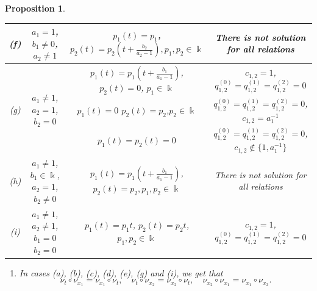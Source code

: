 \documentclass{amsart}
\newtheorem{proposition}[theorem]{Proposition}
\theoremstyle{definition}
\theoremstyle{remark}
\numberwithin{equation}{section}
\begin{document}
\begin{proposition}
\begin{table}[h]
\begin{center}
{\begin{tabular}{ |c|c|c|c| }
\hline
{{\rm (f)}} & $a_1=1$, $b_1\not=0$, $a_2\not=1$ & $p_1(t)=p_1$,  $p_2(t)=p_2\left(t+\frac{b_2}{a_2-1}\right), p_1,p_2\in\Bbbk$ & There is not solution for all relations \\ 
\hline
\multirow{3}{*}{{\rm (g)}} & \multirow{3}{*}{$a_1\not=1$,  $a_2=1$, $b_2=0$} & $p_1(t)=p_1\left(t+\frac{b_1}{a_1-1}\right)$, $p_2(t)=0$, $p_1\in\Bbbk$ & $c_{1,2}=1$, $q_{1,2}^{(0)}=q_{1,2}^{(1)}=q_{1,2}^{(2)}=0$ \\ \cline{3-4}
&  & $p_1(t)=0$ $p_2(t)=p_2$,$p_2\in\Bbbk$  & $q_{1,2}^{(0)}=q_{1,2}^{(1)}=q_{1,2}^{(2)}=0$,  $c_{1,2}=a_{1}^{-1}$ \\ \cline{3-4}
&  & $p_1(t)=p_2(t)=0$ & $q_{1,2}^{(0)}=q_{1,2}^{(1)}=q_{1,2}^{(2)}=0$,  $c_{1,2}\not\in\{1,a_1^{-1}\}$ \\ 
\hline
{{\rm (h)}} & $a_1\not=1$, $b_1\in\Bbbk$,  $a_2=1$, $b_2\not=0$ & $p_1(t)=p_1\left(t+\frac{b_1}{a_1-1}\right)$,  $p_2(t)=p_2, p_1,p_2\in\Bbbk$ & There is not solution for all relations \\ 
\hline
{{\rm (i)}} & $a_1\not=1$,  $a_2\not=1$, $b_1=0$ $b_2=0$ & $p_1(t)=p_1t$,  $p_2(t)=p_2t$, $p_1,p_2\in\Bbbk$ & $c_{1,2}=1$, $q_{1,2}^{(0)}=q_{1,2}^{(1)}=q_{1,2}^{(2)}=0$ \\ 
\hline
\end{tabular}
}
\end{center}
\end{table}

\begin{enumerate}
\item [\rm (2)] In cases {\rm (a)}, {\rm (b)}, {\rm (c)}, {\rm (d)}, {\rm (e)}, {\rm (g)} and {\rm (i)}, we get that 
    \begin{equation}\label{Eq1skew}
   \nu_t \circ \nu_{x_1} = \nu_{x_1} \circ \nu_t, \quad \nu_t \circ \nu_{x_2} = \nu_{x_2} \circ \nu_t, \quad \nu_{x_2} \circ \nu_{x_1} = \nu_{x_1} \circ \nu_{x_2}.
    \end{equation}
\end{enumerate}
\end{proposition}
\end{document}
